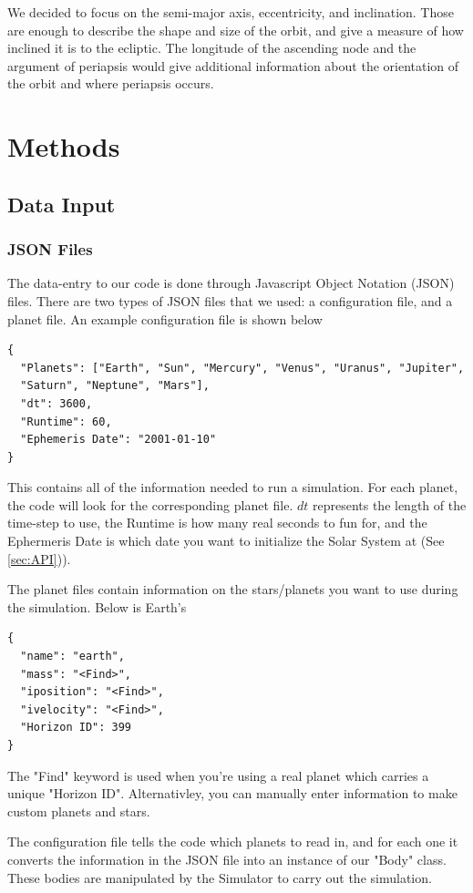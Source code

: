 \documentclass[a4paper,12pt]{article} %
\numberwithin{equation}{section} %
\numberwithin{figure}{section} %
\begin{document}
We decided to focus on the semi-major axis, eccentricity, and inclination. Those are enough to describe the shape and size of the orbit, and give a measure of how inclined it is to the ecliptic. The longitude of the ascending node and the argument of periapsis would give additional information about the orientation of the orbit and where periapsis occurs.

\section{Methods}

\subsection{Data Input}

\subsubsection{JSON Files}

The data-entry to our code is done through Javascript Object Notation (JSON) files. There are two types of JSON files that we used: a configuration file, and a planet file. An example configuration file is shown below

\begin{lstlisting}
{
  "Planets": ["Earth", "Sun", "Mercury", "Venus", "Uranus", "Jupiter",
  "Saturn", "Neptune", "Mars"],
  "dt": 3600,
  "Runtime": 60,
  "Ephemeris Date": "2001-01-10"
}
\end{lstlisting}

This contains all of the information needed to run a simulation. For each planet, the code will look for the corresponding planet file. $dt$ represents the length of the time-step to use, the Runtime is how many real seconds to fun for, and the Ephermeris Date is which date you want to initialize the Solar System at (See \ref{sec:API})). \par
The planet files contain information on the stars/planets you want to use during the simulation. Below is Earth's

\begin{lstlisting}
{
  "name": "earth",
  "mass": "<Find>",
  "iposition": "<Find>",
  "ivelocity": "<Find>",
  "Horizon ID": 399
}
\end{lstlisting}

The "\<Find\>" keyword is used when you're using a real planet which carries a unique "Horizon ID". Alternativley, you can manually enter information to make custom planets and stars. \par
The configuration file tells the code which planets to read in, and for each one it converts the information in the JSON file into an instance of our "Body" class. These bodies are manipulated by the Simulator to carry out the simulation.
\end{document}
